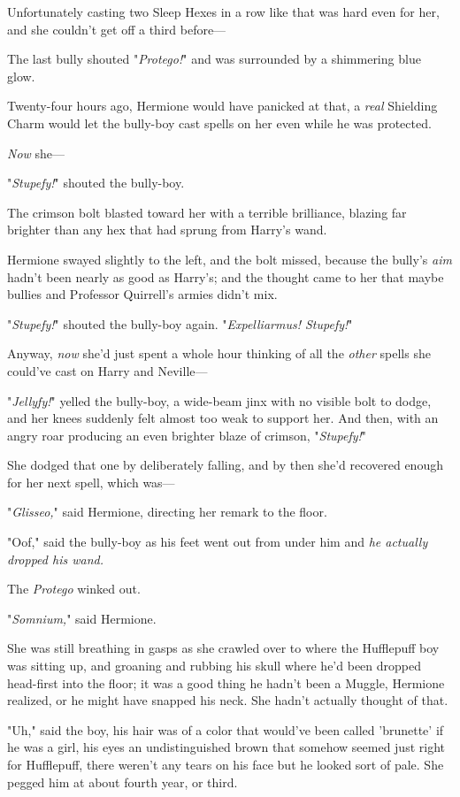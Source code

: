 Unfortunately casting two Sleep Hexes in a row like that was hard even for her, 
and she couldn't get off a third before---

The last bully shouted "\emph{Protego!}" and was surrounded by a shimmering 
blue glow.

Twenty-four hours ago, Hermione would have panicked at that, a \emph{real} 
Shielding Charm would let the bully-boy cast spells on her even while he was 
protected.

\emph{Now} she---

"\emph{Stupefy!}" shouted the bully-boy.

The crimson bolt blasted toward her with a terrible brilliance, blazing far 
brighter than any hex that had sprung from Harry's wand.

Hermione swayed slightly to the left, and the bolt missed, because the bully's 
\emph{aim} hadn't been nearly as good as Harry's; and the thought came to her 
that maybe bullies and Professor Quirrell's armies didn't mix.

"\emph{Stupefy!}" shouted the bully-boy again. "\emph{Expelliarmus! Stupefy!}"

Anyway, \emph{now} she'd just spent a whole hour thinking of all the 
\emph{other} spells she could've cast on Harry and Neville---

"\emph{Jellyfy!}" yelled the bully-boy, a wide-beam jinx with no visible bolt 
to dodge, and her knees suddenly felt almost too weak to support her. And then, 
with an angry roar producing an even brighter blaze of crimson, 
"\emph{Stupefy!}"

She dodged that one by deliberately falling, and by then she'd recovered enough 
for her next spell, which was---

"\emph{Glisseo,}" said Hermione, directing her remark to the floor.

"Oof," said the bully-boy as his feet went out from under him and \emph{he 
actually dropped his wand.}

The \emph{Protego} winked out.

"\emph{Somnium,}" said Hermione.

She was still breathing in gasps as she crawled over to where the Hufflepuff 
boy was sitting up, and groaning and rubbing his skull where he'd been dropped 
head-first into the floor; it was a good thing he hadn't been a Muggle, 
Hermione realized, or he might have snapped his neck. She hadn't actually 
thought of that.

"Uh," said the boy, his hair was of a color that would've been called 
'brunette' if he was a girl, his eyes an undistinguished brown that somehow 
seemed just right for Hufflepuff, there weren't any tears on his face but he 
looked sort of pale. She pegged him at about fourth year, or third.

